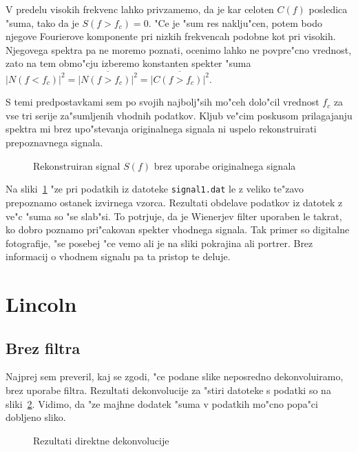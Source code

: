 \documentclass[a4paper,10pt]{article}
\begin{document}
V predelu visokih frekvenc lahko privzamemo, da je kar celoten $C(f)$ posledica "suma, tako da je $S(f>f_c) = 0$. "Ce je "sum res naklju"cen, potem bodo njegove Fourierove komponente pri nizkih frekvencah podobne kot pri visokih. Njegovega spektra pa ne moremo poznati, ocenimo lahko ne povpre"cno vrednost, zato na tem obmo"cju izberemo konstanten spekter "suma $|N(f < f_c)|^2 = \overline{|N(f>f_c)|^2} = \overline{|C(f>f_c)|^2}$. 

S temi predpostavkami sem po svojih najbolj"sih mo"ceh dolo"cil vrednost $f_c$ za vse tri serije za"sumljenih vhodnih podatkov. Kljub ve"cim poskusom prilagajanju spektra mi brez upo"stevanja originalnega signala ni uspelo rekonstruirati prepoznavnega signala. 

\begin{figure}[h]

\caption{Rekonstruiran signal $S(f)$ brez uporabe originalnega signala}
\label{fig:signal-rekonstruiran-slabo}
\end{figure}

Na sliki~\ref{fig:signal-rekonstruiran-slabo} "ze pri podatkih iz datoteke \texttt{signal1.dat} le z veliko te"zavo prepoznamo ostanek izvirnega vzorca. Rezultati obdelave podatkov iz datotek z ve"c "suma so "se slab"si. To potrjuje, da je Wienerjev filter uporaben le takrat, ko dobro poznamo pri"cakovan spekter vhodnega signala. Tak primer so digitalne fotografije, "se posebej "ce vemo ali je na sliki pokrajina ali portrer. Brez informacij o vhodnem signalu pa ta pristop te deluje. 

\clearpage
\section{Lincoln}

\subsection{Brez filtra}
Najprej sem preveril, kaj se zgodi, "ce podane slike neposredno dekonvoluiramo, brez uporabe filtra. Rezultati dekonvolucije za "stiri datoteke s podatki so na sliki~\ref{fig:lincoln-direkt}. Vidimo, da "ze majhne dodatek "suma v podatkih mo"cno popa"ci dobljeno sliko. 

\begin{figure}[h]
 \centering
{}
\caption{Rezultati direktne dekonvolucije}
\label{fig:lincoln-direkt}
\end{figure}
\end{document}
